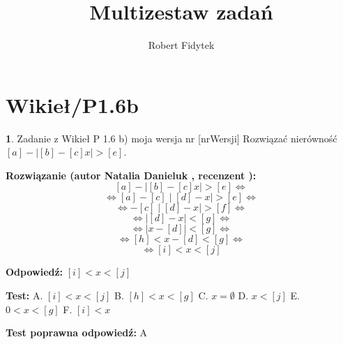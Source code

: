 \documentclass[12pt, a4paper]{article}
\title{Multizestaw zadań}
\author{Robert Fidytek}
\date{}
\theoremstyle{definition} %
\newtheorem{zad}{}
\newcommand{\kategoria}[1]{\section{#1}} %
\newcommand{\zadStart}[1]{\begin{zad}#1\newline} %
\newcommand{\zadStop}{\end{zad}}   %
\newcommand{\rozwStart}[2]{\noindent \textbf{Rozwiązanie (autor #1 , recenzent #2): }\newline} %
\newcommand{\rozwStop}{\newline}                                            %
\newcommand{\odpStart}{\noindent \textbf{Odpowiedź:}\newline}    %
\newcommand{\odpStop}{\newline}                                             %
\newcommand{\testStart}{\noindent \textbf{Test:}\newline} %
\newcommand{\testStop}{\newline} %
\newcommand{\kluczStart}{\noindent \textbf{Test poprawna odpowiedź:}\newline} %
\newcommand{\kluczStop}{\newline} %
\begin{document}
\maketitle

\kategoria{Wikieł/P1.6b}

\zadStart{Zadanie z Wikieł P 1.6 b) moja wersja nr [nrWersji]}
Rozwiązać nierówność $[a] - \mid [b] - [c]x \mid > [e]$.
\zadStop

\rozwStart{Natalia Danieluk}{}
$$[a] - \mid [b] - [c]x \mid > [e] \Leftrightarrow$$ 
$$\Leftrightarrow [a] - [c] \mid [d] - x \mid > [e] \Leftrightarrow$$ 
$$\Leftrightarrow - [c] \mid [d] - x \mid > [f] \Leftrightarrow$$ 
$$\Leftrightarrow \mid [d] - x \mid < [g] \Leftrightarrow$$ 
$$\Leftrightarrow \mid x - [d] \mid < [g] \Leftrightarrow$$ 
$$\Leftrightarrow [h] < x - [d] < [g] \Leftrightarrow$$ 
$$\Leftrightarrow [i] < x < [j]$$ 
\rozwStop

\odpStart
$[i] < x < [j]$
\odpStop

\testStart
A. $[i] < x < [j]$
B. $[h] < x < [g]$
C. $x = \emptyset$
D. $x < [j]$
E. $0 < x < [g]$
F. $[i] < x$
\testStop

\kluczStart
A
\kluczStop
\end{document}
